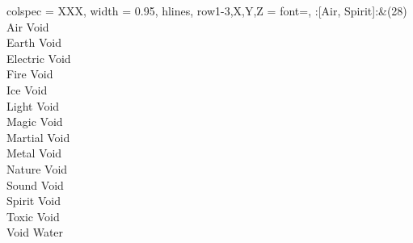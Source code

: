 \begin{longtblr}[
	caption = {2v2 Defending Weak},
	label = {2v2-Defending-Weak},
]{
	colspec = {XXX}, width = 0.95\linewidth,
	hlines,
	row{1-3,X,Y,Z} = {font=\bfseries},
}
	:[Air, Spirit]:&{(28)\\
	Air Void \\
	Earth Void \\
	Electric Void \\
	Fire Void \\
	Ice Void \\
	Light Void \\
	Magic Void \\
	Martial Void \\
	Metal Void \\
	Nature Void \\
	Sound Void \\
	Spirit Void \\
	Toxic Void \\
	Void Water \\
	}\\

\end{longtblr}
\onecolumn
